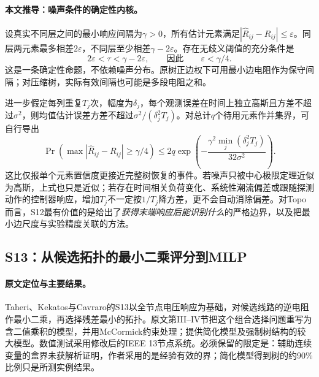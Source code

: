 \documentclass[UTF8,11pt,fontset=fandol]{ctexart}
\theoremstyle{remark}
\numberwithin{equation}{section}
\begin{document}
\paragraph{本文推导：噪声条件的确定性内核。}
设真实不同层之间的最小响应间隔为$\gamma>0$，所有估计元素满足$|\widehat R_{ij}-R_{ij}|\leq\varepsilon$。同层两元素最多相差$2\varepsilon$，不同层至少相差$\gamma-2\varepsilon$。存在无歧义阈值的充分条件是
\begin{equation}
 2\varepsilon<\tau<\gamma-2\varepsilon,
 \qquad\text{因此}\qquad \varepsilon<\gamma/4.
 \label{eq:probe-layer-margin}
\end{equation}
这是一条确定性命题，不依赖噪声分布。原树正边权下可用最小边电阻作为保守间隔；对压缩树，实际有效间隔也可能是多段电阻之和。

进一步假定每列重复$T_j$次，幅度为$\delta_j$，每个观测误差在时间上独立高斯且方差不超过$\sigma^2$，则均值估计误差方差不超过$\sigma^2/(\delta_j^2T_j)$。对总计$q$个待用元素作并集界，可自行导出
\begin{equation}
 \Pr\!\left(\max|\widehat R_{ij}-R_{ij}|\geq\gamma/4\right)
 \leq 2q\exp\!\left(-\frac{\gamma^2\min_j(\delta_j^2T_j)}{32\sigma^2}\right).
 \label{eq:probe-confidence}
\end{equation}
这比仅报单个元素置信度更接近完整树恢复的事件。若噪声只被中心极限定理近似为高斯，上式也只是近似；若存在时间相关负荷变化、系统性潮流偏差或跟随探测动作的控制器响应，增加$T_j$不一定按$1/T_j$降方差，更不会自动消除偏差。对Topo而言，S12最有价值的是给出了\emph{获得末端响应后能识别什么}的严格边界，以及把最小边尺度与实验精度关联的方法。

\subsection{S13：从候选拓扑的最小二乘评分到MILP}
\label{subsec:S13}

\paragraph{原文定位与主要结果。}
Taheri、Kekatos与Cavraro的S13\citep{S13}以全节点电压响应为基础，对候选线路的逆电阻作最小二乘，再选择残差最小的拓扑。原文第III--IV节把这个组合选择问题重写为含二值乘积的模型，并用McCormick约束处理；提供简化模型及强制树结构的较大模型。数值测试采用修改后的IEEE 13节点系统。必须保留的限定是：辅助连续变量的盒界未获解析证明，作者采用的是经验有效的界；简化模型得到树的约90\%比例只是所测实例结果。
\end{document}
